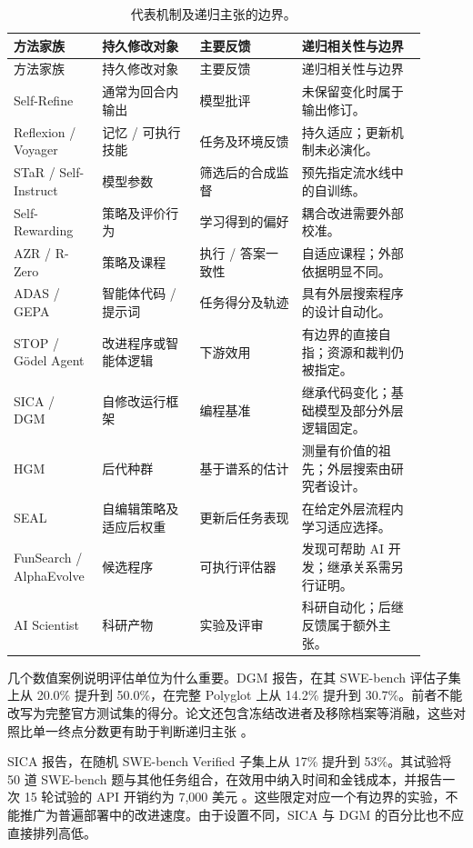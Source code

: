 \documentclass[11pt,,]{article}
\begin{document}
\begin{longtable}{p{0.16\linewidth}p{0.22\linewidth}p{0.23\linewidth}p{0.29\linewidth}}
\caption{代表机制及递归主张的边界。}\label{tab:mechanisms}\\
\toprule
方法家族 & 持久修改对象 & 主要反馈 & 递归相关性与边界 \\
\midrule\endfirsthead
\toprule 方法家族 & 持久修改对象 & 主要反馈 & 递归相关性与边界 \\
\midrule\endhead
Self-Refine & 通常为回合内输出 & 模型批评 & 未保留变化时属于输出修订。 \\
Reflexion / Voyager & 记忆 / 可执行技能 & 任务及环境反馈 & 持久适应；更新机制未必演化。 \\
STaR / Self-Instruct & 模型参数 & 筛选后的合成监督 & 预先指定流水线中的自训练。 \\
Self-Rewarding & 策略及评价行为 & 学习得到的偏好 & 耦合改进需要外部校准。 \\
AZR / R-Zero & 策略及课程 & 执行 / 答案一致性 & 自适应课程；外部依据明显不同。 \\
ADAS / GEPA & 智能体代码 / 提示词 & 任务得分及轨迹 & 具有外层搜索程序的设计自动化。 \\
STOP / G\"odel Agent & 改进程序或智能体逻辑 & 下游效用 & 有边界的直接自指；资源和裁判仍被指定。 \\
SICA / DGM & 自修改运行框架 & 编程基准 & 继承代码变化；基础模型及部分外层逻辑固定。 \\
HGM & 后代种群 & 基于谱系的估计 & 测量有价值的祖先；外层搜索由研究者设计。 \\
SEAL & 自编辑策略及适应后权重 & 更新后任务表现 & 在给定外层流程内学习适应选择。 \\
FunSearch / AlphaEvolve & 候选程序 & 可执行评估器 & 发现可帮助 AI 开发；继承关系需另行证明。 \\
AI Scientist & 科研产物 & 实验及评审 & 科研自动化；后继反馈属于额外主张。 \\
\bottomrule
\end{longtable}

几个数值案例说明评估单位为什么重要。DGM 报告，在其 SWE-bench
评估子集上从 20.0\% 提升到 50.0\%，在完整 Polyglot 上从 14.2\% 提升到
30.7\%。前者不能改写为完整官方测试集的得分。论文还包含冻结改进者及移除档案等消融，这些对照比单一终点分数更有助于判断递归主张
\citep{dgm2025}。

SICA 报告，在随机 SWE-bench Verified 子集上从 17\% 提升到 53\%。其试验将
50 道 SWE-bench 题与其他任务组合，在效用中纳入时间和金钱成本，并报告一次
15 轮试验的 API 开销约为 7,000 美元
\citep{sica2025}。这些限定对应一个有边界的实验，不能推广为普遍部署中的改进速度。由于设置不同，SICA
与 DGM 的百分比也不应直接排列高低。
\end{document}
